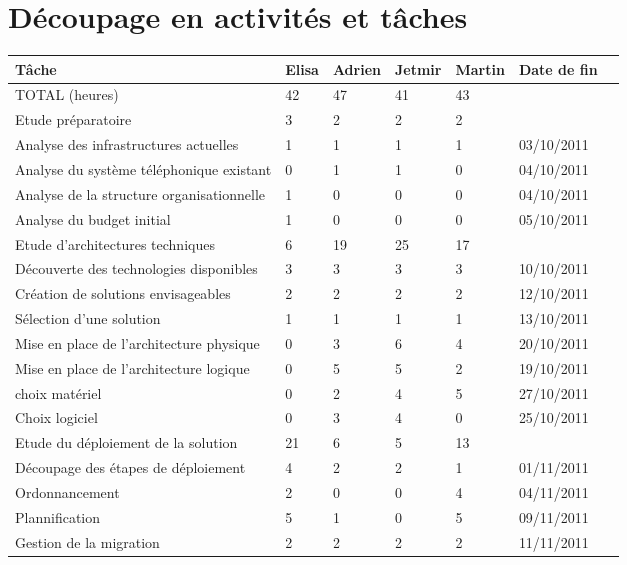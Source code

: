 \section{Découpage en activités et tâches}


\begin{tabular}{|l|l|l|l|l|l|c|}
\hline	
\rowcolor{EnTete} \textbf{Tâche} & \textbf{Elisa} & \textbf{Adrien} & \textbf{Jetmir} & \textbf{Martin} & \textbf{Date de fin} \\ \hline
\rowcolor{Total} TOTAL (heures) & 42 & 47 & 41 & 43 & \\ \hline
\rowcolor{Activite} Etude préparatoire & 3 & 2 & 2 & 2 & \\ \hline
Analyse des infrastructures actuelles & 1 & 1 & 1 & 1 & 03/10/2011 \\ \hline
Analyse du système téléphonique existant & 0 & 1 & 1 & 0 & 04/10/2011 \\ \hline
Analyse de la structure organisationnelle & 1 & 0 & 0 & 0 & 04/10/2011  \\ \hline
Analyse du budget initial & 1 & 0 & 0 & 0 & 05/10/2011 \\ \hline
\rowcolor{Activite} Etude d'architectures techniques & 6 & 19 & 25 & 17 & \\ \hline
Découverte des technologies disponibles & 3 & 3 & 3 & 3 & 10/10/2011  \\ \hline
Création de solutions envisageables & 2 & 2 & 2 & 2 & 12/10/2011  \\ \hline
Sélection d'une solution & 1 & 1 & 1 & 1  & 13/10/2011 \\ \hline
Mise en place de l'architecture physique & 0 & 3 & 6 & 4 & 20/10/2011  \\ \hline
Mise en place de l'architecture logique & 0 & 5 & 5 & 2 & 19/10/2011  \\ \hline
choix matériel & 0 & 2 & 4 & 5 & 27/10/2011 \\ \hline
Choix logiciel & 0 & 3 & 4 & 0 & 25/10/2011  \\ \hline

\rowcolor{Activite} Etude du déploiement de la solution & 21 & 6 & 5 & 13 & \\ \hline
Découpage des étapes de déploiement & 4 & 2 & 2 & 1 & 01/11/2011 \\ \hline
Ordonnancement & 2 & 0 & 0 & 4 & 04/11/2011 \\ \hline
Plannification & 5 & 1 & 0 & 5 & 09/11/2011 \\ \hline
Gestion de la migration & 2 & 2 & 2 & 2 & 11/11/2011 \\ \hline


\end{tabular}
